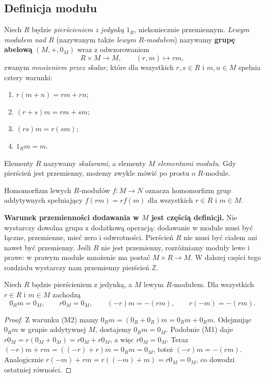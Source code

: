 \subsection{Definicja modułu}
\begin{definicja}
\label{aa:def:module-introduction}
Niech $R$ będzie \emph{pierścieniem z jedynką} $1_R$,
niekoniecznie przemiennym. \emph{Lewym modułem nad $R$}
(nazywanym także \emph{lewym $R$-modułem}) nazywamy
\textbf{grupę abelową} $(M,+,0_M)$ wraz z odwzorowaniem
\[
  R\times M\longrightarrow M,\qquad (r,m)\longmapsto rm,
\]
zwanym \emph{mnożeniem przez skalar}, które dla wszystkich
$r,s\in R$ i $m,n\in M$ spełnia cztery warunki:
\begin{enumerate}[label=\textup{(M\arabic*)}]
\item $r(m+n)=rm+rn$;
\item $(r+s)m=rm+sm$;
\item $(rs)m=r(sm)$;
\item $1_Rm=m$.
\end{enumerate}
Elementy $R$ nazywamy \emph{skalarami}, a elementy $M$
\emph{elementami modułu}. Gdy pierścień jest przemienny,
możemy zwykle mówić po prostu o $R$-module.
\end{definicja}
Homomorfizm lewych $R$-modułów $f:M\to N$ oznacza homomorfizm
grup addytywnych spełniający $f(rm)=rf(m)$ dla wszystkich
$r\in R$ i $m\in M$.

\begin{uwaga}
\label{aa:uw:module-crucial}
\textbf{Warunek przemienności dodawania w $M$ jest częścią definicji.}
Nie wystarczy dowolna grupa z dodatkową operacją: dodawanie
w module musi być łączne, przemienne, mieć zero i odwrotności.
Pierścień $R$ nie musi być ciałem ani nawet być przemienny.
Jeśli $R$ nie jest przemienny, rozróżniamy moduły lewe i prawe:
w prawym module mnożenie ma postać $M\times R\to M$.
W dalszej części tego rozdziału wystarczy nam przemienny
pierścień $\mathbb Z$.
\end{uwaga}

\begin{lemat}
\label{aa:lem:module-zero-minus}
Niech $R$ będzie pierścieniem z jedynką, a $M$ lewym
$R$-modułem. Dla wszystkich $r\in R$ i $m\in M$ zachodzą
\[
 0_Rm=0_M,\qquad r0_M=0_M,\qquad (-r)m=-(rm),
 \qquad r(-m)=-(rm).
\]
\end{lemat}
\begin{proof}
Z warunku (M2) mamy $0_Rm=(0_R+0_R)m=0_Rm+0_Rm$.
Odejmując $0_Rm$ w grupie addytywnej $M$, dostajemy
$0_Rm=0_M$. Podobnie (M1) daje
$r0_M=r(0_M+0_M)=r0_M+r0_M$, a więc $r0_M=0_M$.
Teraz $(-r)m+rm=((-r)+r)m=0_Rm=0_M$, toteż
$(-r)m=-(rm)$. Analogicznie
$r(-m)+rm=r((-m)+m)=r0_M=0_M$,
co dowodzi ostatniej równości.
\end{proof}

